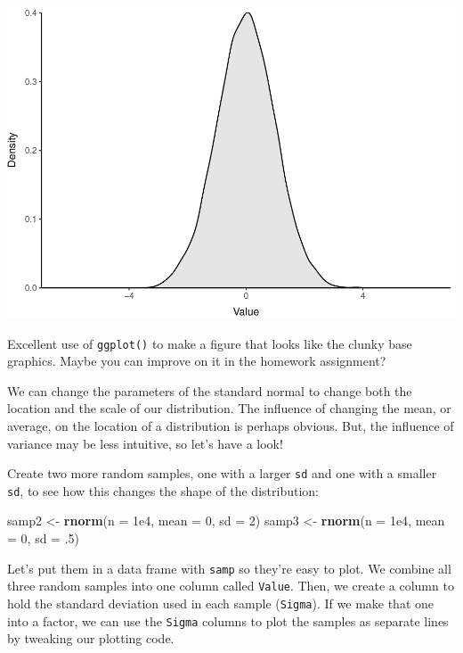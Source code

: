 \documentclass[
]{book}
\newenvironment{Shaded}{\begin{snugshade}}{\end{snugshade}}
\newcommand{\DataTypeTok}[1]{\textcolor[rgb]{0.13,0.29,0.53}{#1}}
\newcommand{\DecValTok}[1]{\textcolor[rgb]{0.00,0.00,0.81}{#1}}
\newcommand{\FloatTok}[1]{\textcolor[rgb]{0.00,0.00,0.81}{#1}}
\newcommand{\KeywordTok}[1]{\textcolor[rgb]{0.13,0.29,0.53}{\textbf{#1}}}
\newcommand{\NormalTok}[1]{#1}
\newcommand{\StringTok}[1]{\textcolor[rgb]{0.31,0.60,0.02}{#1}}
\begin{document}
\includegraphics{worstr_files/figure-latex/unnamed-chunk-118-1.pdf}

Excellent use of \texttt{ggplot()} to make a figure that looks like the clunky base graphics. Maybe you can improve on it in the homework assignment?

We can change the parameters of the standard normal to change both the location and the scale of our distribution. The influence of changing the mean, or average, on the location of a distribution is perhaps obvious. But, the influence of variance may be less intuitive, so let's have a look!

Create two more random samples, one with a larger \texttt{sd} and one with a smaller \texttt{sd}, to see how this changes the shape of the distribution:

\begin{Shaded}
\begin{Highlighting}[]
\NormalTok{samp2 <-}\StringTok{ }\KeywordTok{rnorm}\NormalTok{(}\DataTypeTok{n =} \FloatTok{1e4}\NormalTok{, }\DataTypeTok{mean =} \DecValTok{0}\NormalTok{, }\DataTypeTok{sd =} \DecValTok{2}\NormalTok{)}
\NormalTok{samp3 <-}\StringTok{ }\KeywordTok{rnorm}\NormalTok{(}\DataTypeTok{n =} \FloatTok{1e4}\NormalTok{, }\DataTypeTok{mean =} \DecValTok{0}\NormalTok{, }\DataTypeTok{sd =} \FloatTok{.5}\NormalTok{)}
\end{Highlighting}
\end{Shaded}

Let's put them in a data frame with \texttt{samp} so they're easy to plot. We combine all three random samples into one column called \texttt{Value}. Then, we create a column to hold the standard deviation used in each sample (\texttt{Sigma}). If we make that one into a factor, we can use the \texttt{Sigma} columns to plot the samples as separate lines by tweaking our plotting code.
\end{document}
